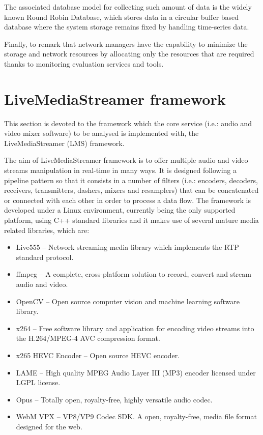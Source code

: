 The associated database model for collecting such amount of data is the widely known Round Robin Database, which stores data in a circular buffer based database where the system storage remains fixed by handling time-series data. 

Finally, to remark that network managers have the capability to minimize the storage and network resources by allocating only the resources that are required thanks to monitoring evaluation services and tools.
 
\section{LiveMediaStreamer framework}\label{SOA:LMS}

This section is devoted to the framework which the core service (i.e.: audio and video mixer software) to be analysed is implemented with, the LiveMediaStreamer (LMS) framework. 

The aim of LiveMediaStreamer framework is to offer multiple audio and video streams manipulation in real-time in many ways. It is designed following a pipeline pattern so that it consists in a number of filters (i.e.: encoders, decoders, receivers, transmitters, dashers, mixers and resamplers) that can be concatenated or connected with each other in order to process a data flow. The framework is developed under a Linux environment, currently being the only supported platform, using C++ standard libraries and it makes use of several mature media related libraries, which are: 

\begin{itemize}
\item Live555 \cite{l555} – Network streaming media library which implements the RTP standard protocol.
\item ffmpeg \cite{ffmpeg} – A complete, cross-platform solution to record, convert and stream audio and video.
\item OpenCV \cite{opencv} – Open source computer vision and machine learning software library.
\item x264 \cite{x264} – Free software library and application for encoding video streams into the H.264/MPEG-4 AVC compression format.
\item x265 HEVC Encoder \cite{x265} – Open source HEVC encoder.
\item LAME \cite{lame} – High quality MPEG Audio Layer III (MP3) encoder licensed under LGPL license.
\item Opus \cite{opus} – Totally open, royalty-free, highly versatile audio codec.
\item WebM VPX \cite{webm} – VP8/VP9 Codec SDK. A open, royalty-free, media file format designed for the web.
\end{itemize}
 
